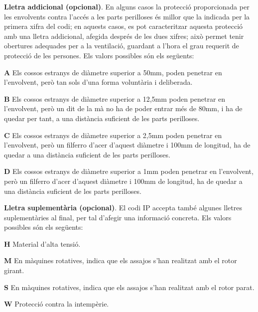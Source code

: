 \textbf{Lletra addicional (opcional)}. En alguns casos la protecci\'{o}
proporcionada per les envolvents contra l'acc\'{e}s a les parts
perilloses \'{e}s millor que la indicada per la primera xifra del codi;
en aquests casos, es pot caracteritzar aquesta protecci\'{o} amb una
lletra addicional, afegida despr\'{e}s de les dues xifres; aix\`{o} permet
tenir obertures adequades per a la ventilaci\'{o},  guardant a l'hora el
grau requerit de protecci\'{o} de les persones. Els valors possibles s\'{o}n
els seg\"{u}ents:
\begin{multicols}{2}
\begin{list}{}
   {\setlength{\labelwidth}{5mm} \setlength{\leftmargin}{5mm} \setlength{\labelsep}{2mm}}
   \item[\textbf{A}] Els  cossos estranys de di\`{a}metre superior a
   50\unit{mm},
    poden penetrar en l'envolvent, per\`{o} tan sols d'una forma volunt\`{a}ria i deliberada.
   \item[\textbf{B}] Els  cossos estranys de di\`{a}metre superior a 12,5\unit{mm}
    poden penetrar en l'envolvent, per\`{o} un dit de la m\`{a} no ha de poder entrar m\'{e}s de 80\unit{mm}, i
    ha de quedar per tant, a una dist\`{a}ncia    suficient de les parts perilloses.
   \item[\textbf{C}] Els  cossos estranys de di\`{a}metre superior a 2,5\unit{mm}
   poden penetrar en l'envolvent, per\`{o} un filferro d'acer d'aquest di\`{a}metre i 100\unit{mm}
   de longitud, ha de quedar a una dist\`{a}ncia suficient de les parts perilloses.
   \item[\textbf{D}] Els  cossos estranys de di\`{a}metre superior a 1\unit{mm}
   poden penetrar en l'envolvent, per\`{o} un filferro d'acer d'aquest di\`{a}metre i 100\unit{mm}
   de longitud, ha de quedar a una dist\`{a}ncia suficient de les parts perilloses.
\end{list}
\end{multicols}

\textbf{Lletra suplement\`{a}ria (opcional)}. El codi \textsf{IP} accepta tamb\'{e} algunes
lletres suplement\`{a}ries al final, per tal d'afegir una informaci\'{o} concreta. Els valors
possibles s\'{o}n els seg\"{u}ents:
\begin{multicols}{2}
\begin{list}{}
   {\setlength{\labelwidth}{6mm} \setlength{\leftmargin}{6mm} \setlength{\labelsep}{2mm}}
   \item[\textbf{H}] Material d'alta tensi\'{o}.
   \item[\textbf{M}] En m\`{a}quines rotatives, indica que els assajos s'han realitzat amb el
    rotor girant.
   \item[\textbf{S}] En m\`{a}quines rotatives, indica que els assajos s'han realitzat amb el
    rotor parat.
   \item[\textbf{W}] Protecci\'{o} contra la intemp\`{e}rie.
\end{list}
\end{multicols}


